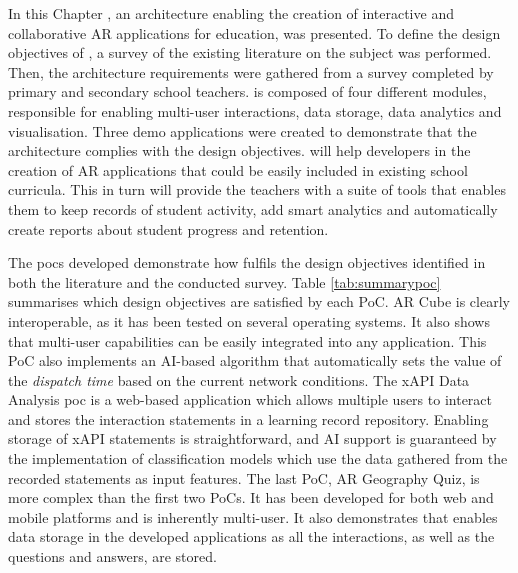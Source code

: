 In this Chapter \arch{}, an architecture enabling the creation of interactive and collaborative AR applications for education, was presented. To define the design objectives of \arch{}, a survey of the existing literature on the subject was performed. Then, the architecture requirements were gathered from a survey completed by primary and secondary school teachers. \arch{} is composed of four different modules, responsible for enabling multi-user interactions, data storage, data analytics and visualisation. Three demo applications were created to demonstrate that the architecture complies with the design objectives. \arch{} will help developers in the creation of AR applications that could be easily included in existing school curricula. This in turn will provide the teachers with a suite of tools that enables them to keep records of student activity, add smart analytics and automatically create reports about student progress and retention. 

The \glspl{poc} developed demonstrate how \arch{} fulfils the design objectives identified in both the literature and the conducted survey. Table \ref{tab:summarypoc} summarises which design objectives are satisfied by each PoC. AR Cube is clearly interoperable, as it has been tested on several operating systems. It also shows that multi-user capabilities can be easily integrated into any application. This PoC also implements an AI-based algorithm that automatically sets the value of the \textit{dispatch time} based on the current network conditions. The xAPI Data Analysis \gls{poc} is a web-based application which allows multiple users to interact and stores the interaction statements in a learning record repository. Enabling storage of xAPI statements is straightforward, and AI support is guaranteed by the implementation of classification models which use the data gathered from the recorded statements as input features. The last PoC, AR Geography Quiz, is more complex than the first two PoCs. It has been developed for both web and mobile platforms and is inherently multi-user. It also demonstrates that \arch{} enables data storage in the developed applications as all the interactions, as well as the questions and answers, are stored.


